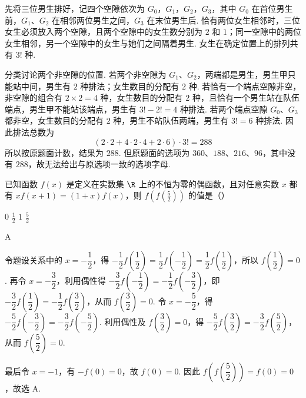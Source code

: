 \begin{solution}
先将三位男生排好，记四个空隙依次为 \(G_0\)，\(G_1\)，\(G_2\)，\(G_3\)，其中 \(G_0\) 在首位男生前，\(G_1\)、\(G_2\) 在相邻两位男生之间，\(G_3\) 在末位男生后. 恰有两位女生相邻时，三位女生必须放入两个空隙，且两个空隙中的女生数分别为 \(2\) 和 \(1\)；同一空隙中的两位女生相邻，另一个空隙中的女生与她们之间隔着男生. 女生在确定位置上的排列共有 \(3!\) 种.

分类讨论两个非空隙的位置. 若两个非空隙为 \(G_1\)、\(G_2\)，两端都是男生，男生甲只能站中间，男生有 \(2\) 种排法；女生数目的分配有 \(2\) 种. 若恰有一个端点空隙非空，非空隙的组合有 \(2\times2=4\) 种，女生数目的分配有 \(2\) 种，且恰有一个男生站在队伍端点，男生甲不能站该端点，男生有 \(3!-2!=4\) 种排法. 若两个端点空隙 \(G_0\)、\(G_3\) 都非空，女生数目的分配有 \(2\) 种，男生不站队伍两端，男生有 \(3!=6\) 种排法. 因此排法总数为
\[
\left(2\cdot2+4\cdot2\cdot4+2\cdot6\right)\cdot3!=288
\]
所以按原题面计数，结果为 \(288\). 但原题面的选项为 \(360\)、\(188\)、\(216\)、\(96\)，其中没有 \(288\)，故无法给出与原选项一致的选项字母.
\end{solution}

\begin{problem}
已知函数 \( f(x) \) 是定义在实数集 \( \R \) 上的不恒为零的偶函数，且对任意实数 \( x \) 都有 \( xf(x + 1) = (1 + x)f(x) \)，则 \( f\left(f\left(\frac{5}{2}\right)\right) \) 的值是（\quad）

\choices
    {\(0\)}
    {\(\frac{1}{2}\)}
    {\(1\)}
    {\(\frac{5}{2}\)}
\end{problem}

\begin{answer}
A
\end{answer}

\begin{solution}
令题设关系中的 \(x=-\dfrac12\)，得
\(-\dfrac12f\left(\dfrac12\right)=\dfrac12f\left(-\dfrac12\right)=\dfrac12f\left(\dfrac12\right)\)，所以 \(f\left(\dfrac12\right)=0\). 再令 \(x=-\dfrac32\)，利用偶性得
\(-\dfrac32f\left(-\dfrac12\right)=-\dfrac12f\left(-\dfrac32\right)\)，即 \(-\dfrac32f\left(\dfrac12\right)=-\dfrac12f\left(\dfrac32\right)\)，从而 \(f\left(\dfrac32\right)=0\). 令 \(x=-\dfrac52\)，得
\(-\dfrac52f\left(-\dfrac32\right)=-\dfrac32f\left(-\dfrac52\right)\). 利用偶性及 \(f\left(\dfrac32\right)=0\)，得
\(-\dfrac52f\left(\dfrac32\right)=-\dfrac32f\left(\dfrac52\right)\)，从而 \(f\left(\dfrac52\right)=0\).

最后令 \(x=-1\)，有 \(-f(0)=0\)，故 \(f(0)=0\). 因此 \(f\left(f\left(\dfrac52\right)\right)=f(0)=0\)，故选 A.
\end{solution}

